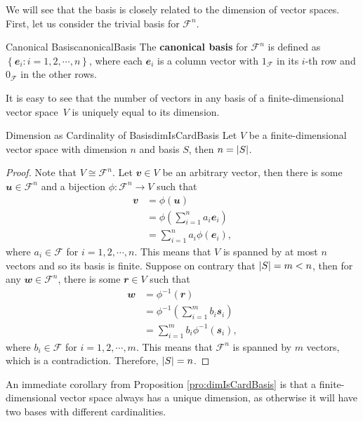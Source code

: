 \documentclass[math, code]{amznotes}
\theoremstyle{remark}
\begin{document}
We will see that the basis is closely related to the dimension of vector spaces. First, let us consider the trivial basis for $\mathcal{F}^n$.
\begin{dfnbox}{Canonical Basis}{canonicalBasis}
    The {\color{red} \textbf{canonical basis}} for $\mathcal{F}^n$ is defined as $\left\{\mathbfit{e}_i \colon i = 1, 2, \cdots, n\right\}$, where each $\mathbfit{e}_i$ is a column vector with $1_{\mathcal{F}}$ in its $i$-th row and $0_{\mathcal{F}}$ in the other rows.
\end{dfnbox}
It is easy to see that the number of vectors in any basis of a finite-dimensional vector space~$V$ is uniquely equal to its dimension.
\begin{probox}{Dimension as Cardinality of Basis}{dimIsCardBasis}
    Let $V$ be a finite-dimensional vector space with dimension $n$ and basis $S$, then $n = {\left\lvert {S} \right\rvert}$.
    \tcblower
    \begin{proof}
        Note that $V \cong \mathcal{F}^n$. Let $\mathbfit{v} \in V$ be an arbitrary vector, then there is some~$\mathbfit{u} \in \mathcal{F}^n$ and a bijection $\phi \colon \mathcal{F}^n \to V$ such that 
        \begin{align*}
            \mathbfit{v} & = \phi(\mathbfit{u}) \\
            & = \phi\left(\sum_{i = 1}^{n}a_i\mathbfit{e}_i\right) \\
            & = \sum_{i = 1}^{n}a_i\phi(\mathbfit{e}_i),
        \end{align*}
        where $a_i \in \mathcal{F}$ for $i = 1, 2, \cdots, n$. This means that $V$ is spanned by at most $n$ vectors and so its basis is finite. Suppose on contrary that ${\left\lvert {S} \right\rvert} = m < n$, then for any $\mathbfit{w} \in \mathcal{F}^n$, there is some $\mathbfit{r} \in V$ such that
        \begin{align*}
            \mathbfit{w} & = \phi^{-1}(\mathbfit{r}) \\
            & = \phi^{-1}\left(\sum_{i = 1}^{m}b_i\mathbfit{s}_i\right) \\
            & = \sum_{i = 1}^{m}b_i\phi^{-1}(\mathbfit{s}_i),
        \end{align*}
        where $b_i \in \mathcal{F}$ for $i = 1, 2, \cdots, m$. This means that $\mathcal{F}^n$ is spanned by $m$ vectors, which is a contradiction. Therefore, ${\left\lvert {S} \right\rvert} = n$.
    \end{proof}
\end{probox}
An immediate corollary from Proposition \ref{pro:dimIsCardBasis} is that a finite-dimensional vector space always has a unique dimension, as otherwise it will have two bases with different cardinalities.
\end{document}
